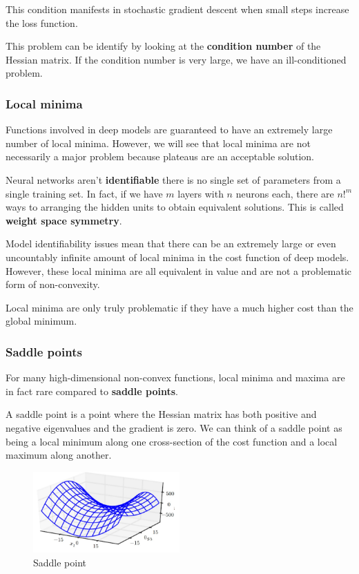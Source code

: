 This condition manifests in stochastic gradient descent when small steps increase
the loss function.

This problem can be identify by looking at the \textbf{condition number} of the
Hessian matrix. If the condition number is very large, we have an ill-conditioned
problem.
\subsubsection{Local minima}
Functions involved in deep models are guaranteed to have an extremely large
number of local minima. However, we will see that local minima are not
necessarily a major problem because plateaus are an acceptable solution.

Neural networks aren't \textbf{identifiable} there is no single set of parameters
from a single training set. In fact, if we have $m$ layers with $n$ neurons each,
there are $n!^m$ ways to arranging the hidden units to obtain equivalent solutions.
This is called \textbf{weight space symmetry}.

Model identifiability issues mean that there can be an extremely large or even
uncountably infinite amount of local minima in the cost function of deep models.
However, these local minima are all equivalent in value and are not a problematic
form of non-convexity.

Local minima are only truly problematic if they have a much higher cost than the
global minimum.
\subsubsection{Saddle points}
For many high-dimensional non-convex functions, local minima and maxima are in
fact rare compared to \textbf{saddle points}.

A saddle point is a point where the Hessian matrix has both positive and negative
eigenvalues and the gradient is zero. We can think of a saddle point as being a
local minimum along one cross-section of the cost function and a local maximum
along another.

\begin{figure}[!ht]
    \centering
    \includegraphics[width=0.5\textwidth]{img/saddle.png}
    \caption{Saddle point}
    \label{fig:saddle}
\end{figure}

